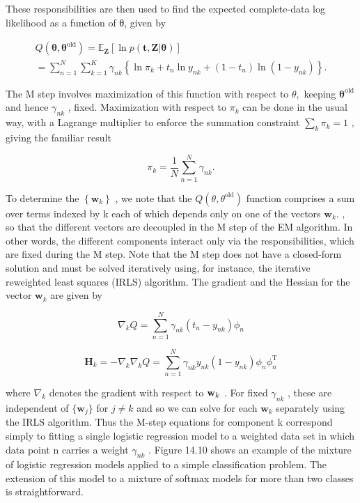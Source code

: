 \documentclass[
  10
]{article}
\begin{document}
These responsibilities are then used to find the expected complete-data
log likelihood as a function of θ, given by

\[
\begin{array}{l} Q (\boldsymbol {\theta}, \boldsymbol {\theta} ^ {\text {old}}) = \mathbb {E} _ {\mathbf {Z}} \left[ \ln p (\mathbf {t}, \mathbf {Z} | \boldsymbol {\theta}) \right] \\ = \sum_ {n = 1} ^ {N} \sum_ {k = 1} ^ {K} \gamma_ {n k} \left\{\ln \pi_ {k} + t _ {n} \ln y _ {n k} + (1 - t _ {n}) \ln (1 - y _ {n k}) \right\}. \end{array}\tag{14.49}
\]

The M step involves maximization of this function with respect to
\(\theta ,\) keeping \(\pmb { \theta } ^ { \mathrm { o l d } }\) and
hence \(\gamma _ { n k }\) , fixed. Maximization with respect to
\(\pi _ { k }\) can be done in the usual way, with a Lagrange multiplier
to enforce the summation constraint
\(\textstyle \sum _ { k } \pi _ { k } = 1\) , giving the familiar result

\[
\pi_ {k} = \frac {1}{N} \sum_ {n = 1} ^ {N} \gamma_ {n k}.\tag{14.50}
\]

To determine the \(\left\{ \mathbf { w } _ { k } \right\}\) , we note
that the \(Q ( \theta , \theta ^ { \mathrm { o l d } } )\) function
comprises a sum over terms indexed by k each of which depends only on
one of the vectors \(\mathbf { w } _ { k } .\) , so that the different
vectors are decoupled in the M step of the EM algorithm. In other words,
the different components interact only via the responsibilities, which
are fixed during the M step. Note that the M step does not have a
closed-form solution and must be solved iteratively using, for instance,
the iterative reweighted least squares (IRLS) algorithm. The gradient
and the Hessian for the vector \(\mathbf { w } _ { k }\) are given by

\[
\nabla_ {k} Q = \sum_ {n = 1} ^ {N} \gamma_ {n k} (t _ {n} - y _ {n k}) \phi_ {n}\tag{14.51}
\]

\[
\mathbf {H} _ {k} = - \nabla_ {k} \nabla_ {k} Q = \sum_ {n = 1} ^ {N} \gamma_ {n k} y _ {n k} (1 - y _ {n k}) \phi_ {n} \phi_ {n} ^ {\mathrm{T}}\tag{14.52}
\]

where \(\nabla _ { k }\) denotes the gradient with respect to
\({ \bf w } _ { k }\) . For fixed \(\gamma _ { n k }\) , these are
independent of \(\{ \mathbf { w } _ { j } \}\) for \(j \neq k\) and so
we can solve for each \(\mathbf { w } _ { k }\) separately using the
IRLS algorithm. Thus the M-step equations for component k correspond
simply to fitting a single logistic regression model to a weighted data
set in which data point n carries a weight \(\gamma _ { n k }\) . Figure
14.10 shows an example of the mixture of logistic regression models
applied to a simple classification problem. The extension of this model
to a mixture of softmax models for more than two classes is
straightforward.
\end{document}
